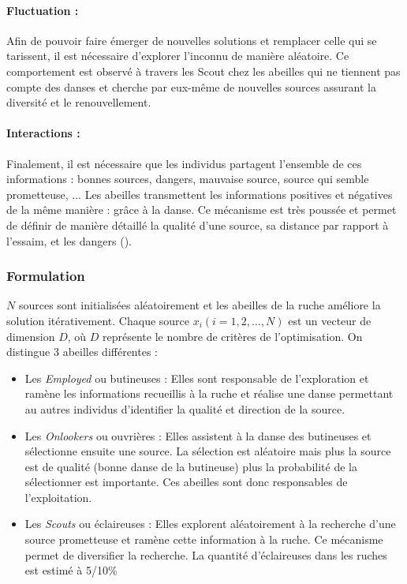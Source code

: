 \paragraph{Fluctuation :} %
\label{par:fluctuation}
Afin de pouvoir faire émerger de nouvelles solutions et remplacer celle qui se
tarissent, il est nécessaire d’explorer l’inconnu de manière aléatoire. Ce comportement est observé
à travers les Scout chez les abeilles qui ne tiennent pas compte des danses et
cherche par eux-même de nouvelles sources assurant la diversité et le renouvellement.

\paragraph{Interactions :} %
\label{par:intractions}
Finalement, il est nécessaire que les individus partagent l’ensemble de ces
informations : bonnes sources, dangers, mauvaise source, source qui semble prometteuse, ...
Les abeilles transmettent les informations positives et négatives de la même manière : grâce à la danse.
Ce mécanisme est très poussée et permet de définir de manière détaillé la qualité
d’une source, sa distance par rapport à l’essaim, et les dangers ().



\subsubsection{Formulation} %
\label{ssub:formulation}
$N$ sources sont initialisées aléatoirement et les abeilles de la
ruche améliore la solution itérativement. Chaque source $x_{i}(i = 1, 2, \dotsc, N)$ est un vecteur
de dimension $D$, où $D$ représente le nombre de critères de l’optimisation.
On distingue 3 abeilles différentes :
\begin{itemize}
  \item Les \emph{Employed} ou butineuses : Elles sont responsable de l’exploration
        et ramène les informations recueillis à la ruche et réalise une danse
        permettant au autres individus d’identifier la qualité et direction de la
        source.
  \item Les \emph{Onlookers} ou ouvrières : Elles assistent à la danse des butineuses
        et sélectionne ensuite une source. La sélection est aléatoire mais plus
        la source est de qualité (bonne danse de la butineuse) plus la probabilité
        de la sélectionner est importante.
        Ces abeilles sont donc responsables de l’exploitation.
  \item Les \emph{Scouts} ou éclaireuses : Elles explorent aléatoirement à la recherche
        d’une source prometteuse et ramène cette information à la ruche. Ce mécanisme
        permet de diversifier la recherche. La quantité d’éclaireuses dans les ruches
        est estimé à 5/10\si{\percent} \parencite{Seeley1996}
\end{itemize}


